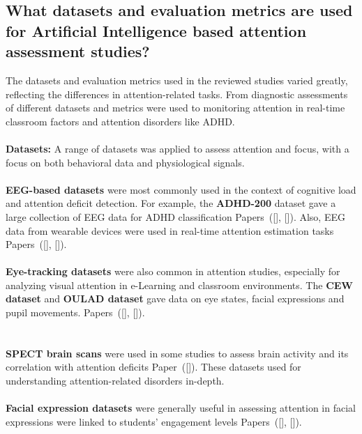 \documentclass[12pt]{article}
\begin{document}
\subsection{What datasets and evaluation metrics are used for Artificial Intelligence based attention assessment studies?}
The datasets and evaluation metrics used in the reviewed studies varied greatly, reflecting the differences in attention-related tasks. From diagnostic assessments of different datasets and metrics were used to monitoring attention in real-time classroom factors and attention disorders like ADHD. \\ \\
\textbf{Datasets:} A range of datasets was applied to assess attention and focus, with a focus on both behavioral data and physiological signals. \\ \\
\textbullet \textbf{EEG-based datasets} were most commonly used in the context of cognitive load and attention deficit detection.  For example, the \textbf{ADHD-200} dataset gave a large collection of EEG data for ADHD classification Papers~([\citealp{ref11}], [\citealp{ref19}]). Also, EEG data from wearable devices were used in real-time attention estimation tasks Papers~([\citealp{ref3}], [\citealp{ref4}]).  \\ \\
\textbullet \textbf{Eye-tracking datasets} were also common in attention studies, especially for analyzing visual attention in e-Learning and classroom environments. The \textbf{CEW dataset} and \textbf{OULAD dataset} gave data on eye states, facial expressions and pupil movements. Papers~([\citealp{ref7}], [\citealp{ref9}]).  \\ \\ \\
\textbullet \textbf{SPECT brain scans} were used in some studies to assess brain activity and its correlation with attention deficits Paper~([\citealp{ref19}]). These datasets used for understanding attention-related disorders in-depth.  \\ \\
\textbullet \textbf{Facial expression datasets} were generally useful in assessing attention in facial expressions were linked to students' engagement levels Papers~([\citealp{ref1}], [\citealp{ref9}]).  \\ \\
\end{document}
